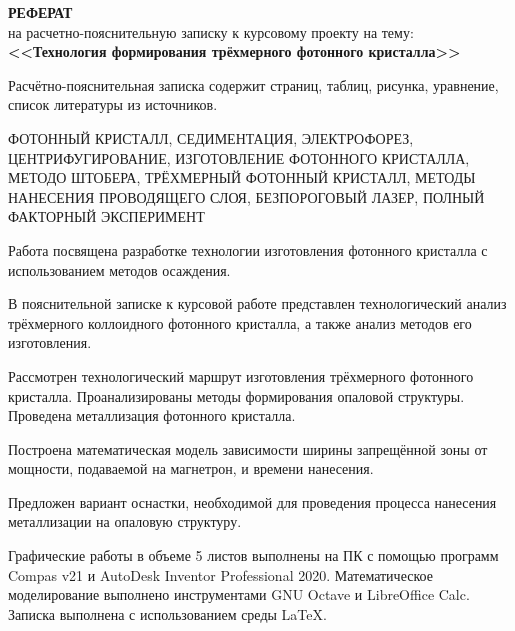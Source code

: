 \documentclass[../template.tex]{subfiles}
\begin{document}
	
\begin{center}
		\MakeUppercase{\bfseries\normalsize РЕФЕРАТ}\\
	на расчетно-пояснительную записку к курсовому проекту на тему:\\
	\bfseries<<Технология формирования трёхмерного фотонного кристалла>>
\end{center}	

Расчётно-пояснительная записка  содержит \pageref{verylastpage} страниц, \totaltables \xspace таблиц, \totalfigures \xspace рисунка, \totalequations \xspace уравнение, список литературы из  источников.


ФОТОННЫЙ КРИСТАЛЛ, СЕДИМЕНТАЦИЯ, ЭЛЕКТРОФОРЕЗ, ЦЕНТРИФУГИРОВАНИЕ, ИЗГОТОВЛЕНИЕ ФОТОННОГО КРИСТАЛЛА, МЕТОДО ШТОБЕРА, ТРЁХМЕРНЫЙ ФОТОННЫЙ КРИСТАЛЛ, МЕТОДЫ НАНЕСЕНИЯ ПРОВОДЯЩЕГО СЛОЯ, БЕЗПОРОГОВЫЙ ЛАЗЕР, ПОЛНЫЙ ФАКТОРНЫЙ ЭКСПЕРИМЕНТ

Работа посвящена разработке технологии изготовления фотонного кристалла с использованием методов осаждения.

В пояснительной записке к курсовой работе представлен технологический анализ трёхмерного коллоидного фотонного кристалла, а также анализ методов его изготовления.

Рассмотрен технологический маршрут изготовления трёхмерного фотонного кристалла. Проанализированы методы формирования опаловой структуры. Проведена металлизация фотонного кристалла. 

Построена математическая модель зависимости  ширины запрещённой зоны от мощности, подаваемой на магнетрон, и времени нанесения.

Предложен вариант оснастки, необходимой для проведения процесса нанесения металлизации на опаловую структуру.


Графические работы в объеме 5 листов выполнены на ПК с помощью программ Compas v21 и AutoDesk Inventor Professional 2020. Математическое моделирование выполнено инструментами GNU Octave и LibreOffice Calc. Записка выполнена с использованием среды \LaTeX.


	
	
\end{document}
